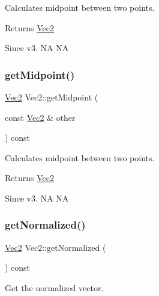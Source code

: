 Calculates midpoint between two points. \begin{DoxyReturn}{Returns}
\hyperlink{classVec2}{Vec2} 
\end{DoxyReturn}
\begin{DoxySince}{Since}
v3.  NA  NA 
\end{DoxySince}
\mbox{\label{classVec2_ab4a3e36ded233d2b3b3f2a6a3ff9ca2c}} 
\subsubsection{\texorpdfstring{get\+Midpoint()}{getMidpoint()}\hspace{0.1cm}{\footnotesize\ttfamily [2/2]}}
{\footnotesize\ttfamily \hyperlink{classVec2}{Vec2} Vec2\+::get\+Midpoint (\begin{DoxyParamCaption}\item[{const \hyperlink{classVec2}{Vec2} \&}]{other }\end{DoxyParamCaption}) const\hspace{0.3cm}{\ttfamily [inline]}}

Calculates midpoint between two points. \begin{DoxyReturn}{Returns}
\hyperlink{classVec2}{Vec2} 
\end{DoxyReturn}
\begin{DoxySince}{Since}
v3.  NA  NA 
\end{DoxySince}
\mbox{\label{classVec2_a1bcbcc58d94b67c58718f2415afad1be}} 
\subsubsection{\texorpdfstring{get\+Normalized()}{getNormalized()}\hspace{0.1cm}{\footnotesize\ttfamily [1/2]}}
{\footnotesize\ttfamily \hyperlink{classVec2}{Vec2} Vec2\+::get\+Normalized (\begin{DoxyParamCaption}{ }\end{DoxyParamCaption}) const}

Get the normalized vector. \mbox{\label{classVec2_a1bcbcc58d94b67c58718f2415afad1be}} 
